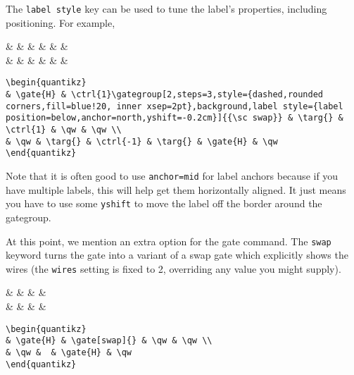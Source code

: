 \documentclass[aps,pra,10pt,nofootinbib]{revtex4}
\begin{document}
The \verb!label style! key can be used to tune the label's properties, including positioning. For example,
\begin{Code}
\begin{center}
\begin{quantikz}
&  &  & \targ{} &  & \qw & \qw \\
& \qw & \targ{} &  & \targ{} &  & \qw
\end{quantikz}
\end{center}
\tcblower
\begin{lstlisting}
\begin{quantikz}
& \gate{H} & \ctrl{1}\gategroup[2,steps=3,style={dashed,rounded corners,fill=blue!20, inner xsep=2pt},background,label style={label position=below,anchor=north,yshift=-0.2cm}]{{\sc swap}} & \targ{} & \ctrl{1} & \qw & \qw \\
& \qw & \targ{} & \ctrl{-1} & \targ{} & \gate{H} & \qw
\end{quantikz}
\end{lstlisting}
\end{Code}
Note that it is often good to use \verb!anchor=mid! for label anchors because if you have multiple labels, this will help get them horizontally aligned. It just means you have to use some \verb!yshift! to move the label off the border around the gategroup.


At this point, we mention an extra option for the gate command. The \verb!swap! keyword turns the gate into a variant of a {\sc swap} gate which explicitly shows the wires (the \verb!wires! setting is fixed to 2, overriding any value you might supply).
\begin{Code}
\begin{center}
\begin{quantikz}
&  & \gate[swap]{} & \qw & \qw \\
& \qw &  &  & \qw
\end{quantikz}
\end{center}
\tcblower
\begin{lstlisting}
\begin{quantikz}
& \gate{H} & \gate[swap]{} & \qw & \qw \\
& \qw &  & \gate{H} & \qw
\end{quantikz}
\end{lstlisting}
\end{Code}
\end{document}
